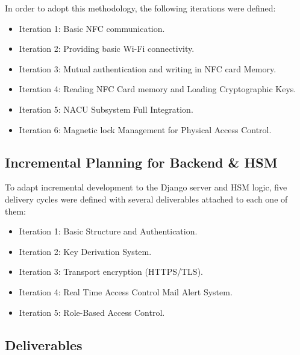 In order to adopt this methodology, the following iterations were defined:

\begin{itemize}
	\item Iteration 1: Basic NFC communication.
	\item Iteration 2: Providing basic Wi-Fi connectivity.
	\item Iteration 3: Mutual authentication and writing in NFC card Memory.
	\item Iteration 4: Reading NFC Card memory and Loading Cryptographic Keys.
	\item Iteration 5: NACU Subsystem Full Integration.
	\item Iteration 6: Magnetic lock Management for Physical Access Control.
\end{itemize}

\subsection{Incremental Planning for Backend \& HSM}

To adapt incremental development to the Django server and HSM logic, five delivery cycles were defined with several deliverables attached to each one of them:

\begin{itemize}
	\item Iteration 1: Basic Structure and Authentication.
	\item Iteration 2: Key Derivation System.
	\item Iteration 3: Transport encryption (HTTPS/TLS).
	\item Iteration 4: Real Time Access Control Mail Alert System.
	\item Iteration 5: Role-Based Access Control.
\end{itemize}

\subsection{Deliverables}

